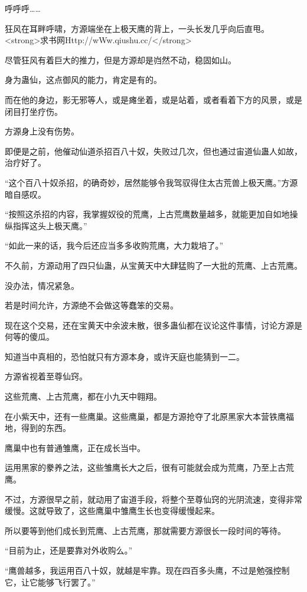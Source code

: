 
\begin{this_body}

呼呼呼……

狂风在耳畔呼啸，方源端坐在上极天鹰的背上，一头长发几乎向后直甩。<strong>求书网Http://wWw.qiushu.cc/</strong>

尽管狂风有着巨大的推力，但是方源却是岿然不动，稳固如山。

身为蛊仙，这点御风的能力，肯定是有的。

而在他的身边，影无邪等人，或是瘫坐着，或是站着，或者看着下方的风景，或是闭目打坐疗伤。

方源身上没有伤势。

即便是之前，他催动仙道杀招百八十奴，失败过几次，但也通过宙道仙蛊人如故，治疗好了。

“这个百八十奴杀招，的确奇妙，居然能够令我驾驭得住太古荒兽上极天鹰。”方源暗自感叹。

“按照这杀招的内容，我掌握奴役的荒鹰，上古荒鹰数量越多，就能更加自如地操纵指挥这头上极天鹰。”

“如此一来的话，我今后还应当多多收购荒鹰，大力栽培了。”

不久前，方源动用了四只仙蛊，从宝黄天中大肆猛购了一大批的荒鹰、上古荒鹰。

没办法，情况紧急。

若是时间允许，方源绝不会做这等蠢笨的交易。

现在这个交易，还在宝黄天中余波未散，很多蛊仙都在议论这件事情，讨论方源是何等的傻瓜。

知道当中真相的，恐怕就只有方源本身，或许天庭也能猜到一二。

方源省视着至尊仙窍。

这些荒鹰、上古荒鹰，都在小九天中翱翔。

在小紫天中，还有一些鹰巢。这些鹰巢，都是方源抢夺了北原黑家大本营铁鹰福地，得到的东西。

鹰巢中也有普通雏鹰，正在成长当中。

运用黑家的豢养之法，这些雏鹰长大之后，很有可能就会成为荒鹰，乃至上古荒鹰。

不过，方源很早之前，就动用了宙道手段，将整个至尊仙窍的光阴流速，变得非常缓慢。这就导致了，这些鹰巢中雏鹰生长也变得缓慢起来。

所以要等到他们成长到荒鹰、上古荒鹰，那就需要方源很长一段时间的等待。

“目前为止，还是要靠对外收购么。”

“鹰兽越多，我运用百八十奴，就越是牢靠。现在四百多头鹰，不过是勉强控制它，让它能够飞行罢了。”


\end{this_body}
